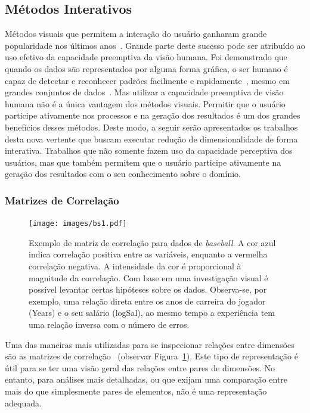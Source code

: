 \subsection{Métodos Interativos}\label{ss:int}

Métodos visuais que permitem a interação do usuário ganharam
grande popularidade nos últimos anos~\cite{State2012}.
Grande parte deste sucesso pode ser atribuído ao uso efetivo
da capacidade preemptiva da visão humana. Foi demonstrado
que quando os dados são representados por alguma forma
gráfica, o ser humano é capaz de detectar e reconhecer
padrões facilmente e rapidamente~\cite{Healey1995}, mesmo em
grandes conjuntos de dados~\cite{Fodor2002}. Mas utilizar a
capacidade preemptiva de visão humana não é a única vantagem
dos métodos visuais. Permitir que o usuário participe
ativamente nos processos e na geração dos resultados é um
dos grandes benefícios desses métodos. Deste
modo, a seguir serão apresentados os trabalhos desta nova
vertente que buscam executar redução de dimensionalidade de
forma interativa. Trabalhos que não somente fazem uso da
capacidade perceptiva dos usuários, mas que também permitem
que o usuário participe ativamente na geração dos resultados
com o seu conhecimento sobre o domínio.

\subsubsection{Matrizes de Correlação}\label{sss:cormat}

\begin{figure}[h!]
    \centering
    \texttt{[image: images/bs1.pdf]}
    \caption[Matrizes de Correlação]
    {Exemplo de matriz de correlação para dados de
    \emph{baseball}. A cor azul indica correlação
    positiva entre as variáveis, enquanto a vermelha
    correlação negativa. A intensidade da cor é
    proporcional à magnitude da correlação. Com base em
    uma investigação visual é possível levantar certas
    hipóteses sobre os dados.  Observa-se, por exemplo,
    uma relação direta entre os anos de carreira do
    jogador (Years) e o seu salário (logSal), ao mesmo tempo
    a experiência tem uma relação inversa com o número de
    erros.} 
    \label{fig:bs1}
\end{figure}

Uma das maneiras mais utilizadas para se inspecionar
relações entre dimensões são as matrizes de
correlação~\cite{Friendly2002} (observar
Figura~\ref{fig:bs1}). Este tipo de representação é útil
para se ter uma visão geral das relações entre pares de
dimensões. No entanto, para análises mais detalhadas, ou que
exijam uma comparação entre mais do que simplesmente pares
de elementos, não é uma representação adequada.

